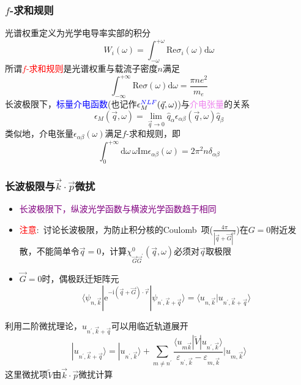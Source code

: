 \documentclass[cjk,slidestop,compress,mathserif,blue]{beamer}
\begin{document}
\frame
{
	\frametitle{$f$-求和规则}
	光谱权重定义为光学电导率实部的积分
	\begin{displaymath}
		W_i(\omega)=\int_{-\omega}^{+\omega}\mathrm{Re}\sigma_i(\omega)\mathrm{d}\omega
	\end{displaymath}
	所谓\textcolor{red}{$f$-求和规则}是光谱权重与载流子密度$n$满足
	\begin{displaymath}
		\int_{-\infty}^{+\infty}\mathrm{Re}\sigma(\omega)\mathrm{d}\omega=\frac{\pi ne^2}{m_e}
	\end{displaymath}
	长波极限下，\textcolor{blue}{标量介电函数}(也记作$\epsilon_M^{\textcolor{blue}{NLF}}(\vec q,\omega)$)与\textcolor{violet}{介电张量}的关系
	\begin{displaymath}
		\epsilon_M(\vec q,\omega)=\lim_{\vec q\rightarrow0}\hat q_{\alpha}\epsilon_{\alpha\beta}(\vec q,\omega)\hat q_{\beta}
	\end{displaymath}
	类似地，介电张量$\epsilon_{\alpha\beta}(\omega)$满足$f$-求和规则，即
	\begin{displaymath}
		\int_0^{+\infty}\mathrm{d}\omega\,\omega\mathrm{Im}\epsilon_{\alpha\beta}(\omega)=2\pi^2n\delta_{\alpha\beta}
	\end{displaymath}
}

\frame
{
	\frametitle{长波极限与$\vec k\cdot\vec p$微扰}
	\begin{itemize}
		\item \textcolor{purple}{长波极限下，纵波光学函数与横波光学函数趋于相同}
		\item \textcolor{red}{注意}:~讨论长波极限，为防止积分核的\textrm{Coulomb~}项($\frac{4\pi}{|\vec q+\vec G|^2}$)在$G=0$附近发散，不能简单令$\vec q=0$，计算$\chi_{\vec G\vec G^{\prime}}^0(\vec q,\omega)$必须对$\vec q$取极限
		\item $\vec G=0$时，偶极跃迁矩阵元
			\begin{displaymath}
				\langle\psi_{n,\vec k}|\mathrm{e}^{-\mathrm{i}(\vec q+\vec G)\cdot\vec r}|\psi_{n^{\prime},\vec k+\vec q}\rangle=\langle u_{n,\vec k}|u_{n^{\prime},\vec k+\vec q}\rangle
			\end{displaymath}
	\end{itemize}
	利用二阶微扰理论，$u_{n^{\prime},\vec k+\vec q}$可以用临近轨道展开
	\begin{displaymath}
		|u_{n^{\prime},\vec k+\vec q}\rangle=|u_{n^{\prime},\vec k}\rangle+\sum_{m\neq n^{\prime}}\frac{\langle u_{m\vec k}|\tilde V|u_{n^{\prime},\vec k}\rangle}{\varepsilon_{n^{\prime},\vec k}-\varepsilon_{m,\vec k}}|u_{m,\vec k}\rangle
	\end{displaymath}
	这里微扰项$\tilde V$由$\vec k\cdot\vec p$微扰计算
}
\end{document}
